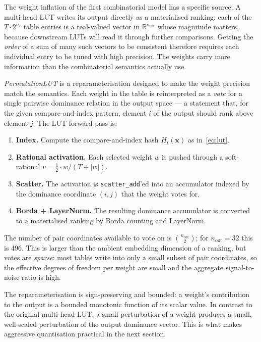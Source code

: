 \documentclass[11pt]{article}
\begin{document}
The weight inflation of the first combinatorial model has a specific source.
A multi-head LUT writes its output directly as a materialised ranking: each of the $T \cdot 2^{n_c}$ table entries is a real-valued vector in $\mathbb{R}^{n_\mathrm{out}}$ whose magnitude matters, because downstream LUTs will read it through further comparisons.
Getting the \emph{order} of a sum of many such vectors to be consistent therefore requires each individual entry to be tuned with high precision.
The weights carry more information than the combinatorial semantics actually use.

\emph{PermutationLUT} is a reparameterisation designed to make the weight precision match the semantics.
Each weight in the table is reinterpreted as a \emph{vote} for a single pairwise dominance relation in the output space --- a statement that, for the given compare-and-index pattern, element $i$ of the output should rank above element $j$.
The LUT forward pass is:
\begin{enumerate}
    \item \textbf{Index.} Compute the compare-and-index hash $H_t(\mathbf{x})$ as in~\eqref{eq:lut}.
    \item \textbf{Rational activation.} Each selected weight $w$ is pushed through a soft-rational $v = \tfrac{1}{2} \cdot w / (T + |w|)$.
    \item \textbf{Scatter.} The activation is \texttt{scatter\_add}'ed into an accumulator indexed by the dominance coordinate $(i, j)$ that the weight votes for.
    \item \textbf{Borda + LayerNorm.} The resulting dominance accumulator is converted to a materialised ranking by Borda counting and LayerNorm.
\end{enumerate}
The number of pair coordinates available to vote on is $\binom{n_\mathrm{out}}{2}$; for $n_\mathrm{out} = 32$ this is 496.
This is larger than the ambient embedding dimension of a ranking, but votes are \emph{sparse}: most tables write into only a small subset of pair coordinates, so the effective degrees of freedom per weight are small and the aggregate signal-to-noise ratio is high.

The reparameterisation is sign-preserving and bounded: a weight's contribution to the output is a bounded monotonic function of its scalar value.
In contrast to the original multi-head LUT, a small perturbation of a weight produces a small, well-scaled perturbation of the output dominance vector.
This is what makes aggressive quantisation practical in the next section.
\end{document}
